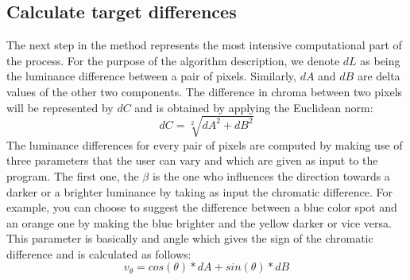 \documentclass[conference]{IEEEtran}
\begin{document}
\subsection{Calculate target differences}
The next step in the method represents the most intensive computational part of the process. For the purpose of the algorithm description, we denote $\mathit{dL}$ as being the luminance difference between a pair of pixels. Similarly, $\mathit{dA}$ and $\mathit{dB}$ are delta values of the other two components. The difference in chroma between two pixels will be represented by $\mathit{dC}$ and is obtained by applying the Euclidean norm:
\[ 
dC =  \sqrt[2]{dA^2 + dB^2}
\]
The luminance differences for every pair of pixels are computed by making use of three parameters that the user can vary and which are given as input to the program. 
The first one, the ${\beta}$ is the one who influences the direction towards a darker or a brighter luminance by taking as input the chromatic difference. For example, you can choose to suggest the difference between a blue color spot and an orange one by making the blue brighter and the yellow darker or vice versa. This parameter is basically and angle which gives the sign of the chromatic difference and is calculated as follows:
\[ 
v_\theta =  cos(\theta) * dA + sin(\theta) * dB
\]
\end{document}
